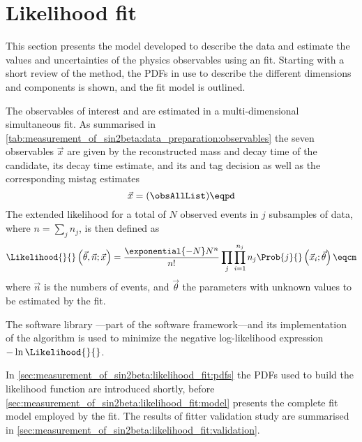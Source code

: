 
\section{Likelihood fit}
\label{sec:measurement_of_sin2beta:likelihood_fit}

This section presents the model developed to describe the data and estimate the
values and uncertainties of the physics observables using an \uEML fit. Starting
with a short review of the \uEML method, the \acp{PDF} in use to describe the
different dimensions and components is shown, and the fit model is outlined.

The \CP observables of interest \SJpsiKS and \CJpsiKS are estimated in a
multi-dimensional simultaneous \uEML fit. As summarised in
\cref{tab:measurement_of_sin2beta:data_preparation:observables} the seven
observables $\vec{x}$ are given by the reconstructed mass and decay time of the
\Bd candidate, its decay time estimate, and its \OS and \SSpi tag decision as
well as the corresponding mistag estimates
%
\begin{equation}\label{eq:measurement_of_sin2beta:likelihood_fit:observables}
  \vec{x} = (\obsAllList)\eqpd  
\end{equation}
%
The extended likelihood for a total of $N$ observed events in $j$ subsamples of
data, where $n=\sum_j n_j$, is then defined as
%
\begin{equation}\label{eq:measurement_of_sin2beta:likelihood_fit:uEML}
  \Likelihood{}{}\left(\vec{\theta},\vec{n};\vec{x}\right) = \frac{\exponential{-N} N^n}{n!} \prod_j \prod_{i=1}^{n_j} n_j \Prob{j}{}\left(\vec{x}_i;\vec{\theta}\right)\eqcm
\end{equation}
%
where $\vec{n}$ is the numbers of events, and $\vec{\theta}$ the parameters with
unknown values to be estimated by the \uEML fit. 

The software library \RooFit---part of the \ROOT software framework---and its
implementation of the \Minuit algorithm is used to minimize the negative
log-likelihood expression $-\ln\Likelihood{}{}$.

In \cref{sec:measurement_of_sin2beta:likelihood_fit:pdfs} the \acp{PDF} used to
build the likelihood function are introduced shortly, before
\cref{sec:measurement_of_sin2beta:likelihood_fit:model} presents the complete
fit model employed by the \uEML fit. The results of fitter validation study are
summarised in \cref{sec:measurement_of_sin2beta:likelihood_fit:validation}.

